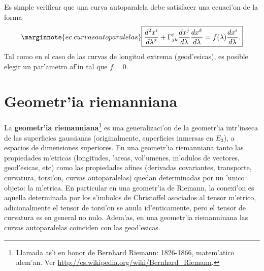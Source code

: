 Es simple verificar que una curva autoparalela debe satisfacer una ecuaci'on de la forma
\begin{equation}\marginnote{ec. curvas autoparalelas}
\boxed{\frac{d^2x^i}{d\lambda^2}+\Gamma_{jk}^i \frac{dx^j}{d\lambda}
\frac{dx^k}{d\lambda} =f(\lambda)\frac{dx^i}{d\lambda}.}
\end{equation}
Tal como en el caso de las curvas de longitud extrema (geod'esicas), es posible elegir un par'ametro af'in tal que $f=0$. 
%

\section{Geometr'ia riemanniana}

La \textbf{geometr'ia riemanniana}\footnote{Llamada as'i en honor de Bernhard Riemann: 1826-1866, matem'atico alem'an. Ver \url{http://es.wikipedia.org/wiki/Bernhard_Riemann}.} es una generalizaci'on de la geometr'ia intr'inseca de las superficies gaussianas (originalmente, superficies inmersas en $E_3$), a espacios de dimensiones superiores. En una geometr'ia riemanniana tanto las propiedades m'etricas (longitudes, 'areas, vol'umenes, m'odulos de vectores, geod'esicas, etc) como las propiedades afines (derivadas covariantes, transporte, curvatura, torsi'on, curvas autoparalelas) quedan determinadas por un 'unico objeto: la m'etrica. En particular en una geometr'ia de Riemann, la conexi'on es aquella determinada por los s'imbolos de Christoffel asociados al tensor m'etrico, adicionalmente el tensor de torsi'on se anula id'enticamente, pero el tensor de curvatura es en general no nulo. Adem'as, en una geometr'ia riemanninana las curvas autoparalelas coinciden con las geod'esicas.



